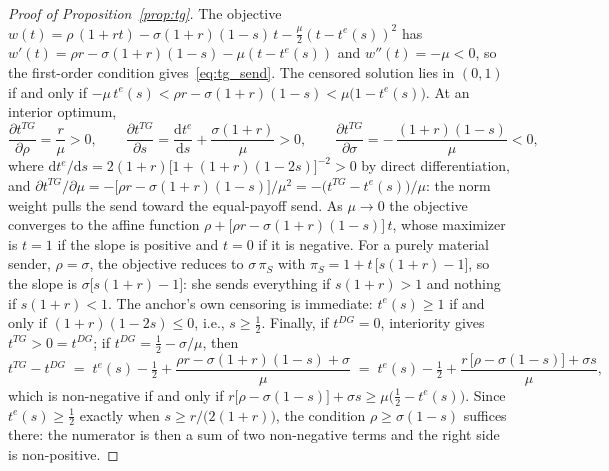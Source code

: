 \documentclass[11pt]{article}
\theoremstyle{plain}
\theoremstyle{remark}
\begin{document}
\begin{proof}[Proof of Proposition~\ref{prop:tg}]
The objective $w(t)=\rho\,(1+rt)-\sigma(1+r)(1-s)\,t-\frac{\mu}{2}\left(t-t^{e}(s)\right)^{2}$ has $w'(t)=\rho r-\sigma(1+r)(1-s)-\mu\left(t-t^{e}(s)\right)$ and $w''(t)=-\mu<0$, so the first-order condition gives~\eqref{eq:tg_send}. The censored solution lies in $(0,1)$ if and only if $-\mu\,t^{e}(s)<\rho r-\sigma(1+r)(1-s)<\mu\bigl(1-t^{e}(s)\bigr)$. At an interior optimum,
\begin{equation*}
\frac{\partial t^{TG}}{\partial \rho}=\frac{r}{\mu}>0,\qquad
\frac{\partial t^{TG}}{\partial s}=\frac{\mathrm{d}t^{e}}{\mathrm{d}s}+\frac{\sigma(1+r)}{\mu}>0,\qquad
\frac{\partial t^{TG}}{\partial \sigma}=-\,\frac{(1+r)(1-s)}{\mu}<0,
\end{equation*}
where $\mathrm{d}t^{e}/\mathrm{d}s=2(1+r)\bigl[1+(1+r)(1-2s)\bigr]^{-2}>0$ by direct differentiation, and $\partial t^{TG}/\partial\mu=-\bigl[\rho r-\sigma(1+r)(1-s)\bigr]/\mu^{2}=-\bigl(t^{TG}-t^{e}(s)\bigr)/\mu$: the norm weight pulls the send toward the equal-payoff send. As $\mu\to 0$ the objective converges to the affine function $\rho+\bigl[\rho r-\sigma(1+r)(1-s)\bigr]\,t$, whose maximizer is $t=1$ if the slope is positive and $t=0$ if it is negative. For a purely material sender, $\rho=\sigma$, the objective reduces to $\sigma\,\pi_S$ with $\pi_S=1+t\,\bigl[s(1+r)-1\bigr]$, so the slope is $\sigma\bigl[s(1+r)-1\bigr]$: she sends everything if $s(1+r)>1$ and nothing if $s(1+r)<1$. The anchor's own censoring is immediate: $t^{e}(s)\ge1$ if and only if $(1+r)(1-2s)\le0$, i.e., $s\ge\tfrac12$. Finally, if $t^{DG}=0$, interiority gives $t^{TG}>0=t^{DG}$; if $t^{DG}=\frac12-\sigma/\mu$, then
\begin{equation*}
t^{TG}-t^{DG}\;=\;t^{e}(s)-\tfrac12+\frac{\rho r-\sigma(1+r)(1-s)+\sigma}{\mu}\;=\;t^{e}(s)-\tfrac12+\frac{r\,\bigl[\rho-\sigma(1-s)\bigr]+\sigma s}{\mu},
\end{equation*}
which is non-negative if and only if $r\bigl[\rho-\sigma(1-s)\bigr]+\sigma s\ge\mu\bigl(\tfrac12-t^{e}(s)\bigr)$. Since $t^{e}(s)\ge\tfrac12$ exactly when $s\ge r/\bigl(2(1+r)\bigr)$, the condition $\rho\ge\sigma(1-s)$ suffices there: the numerator is then a sum of two non-negative terms and the right side is non-positive.
\end{proof}
\end{document}
